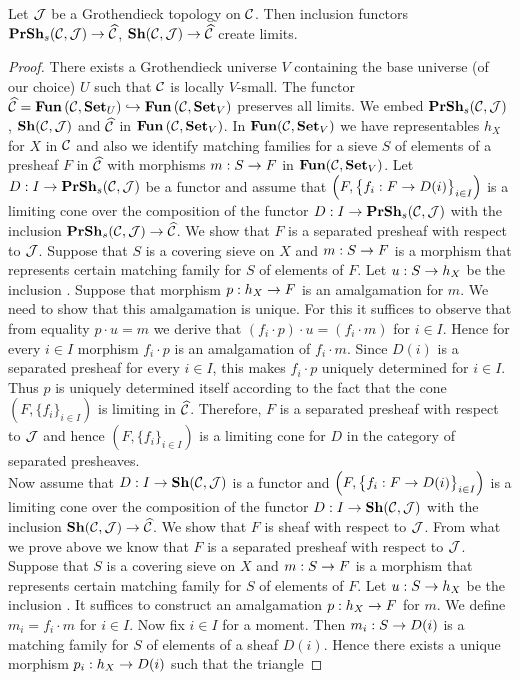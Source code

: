 \begin{theorem}\label{theorem:limitsinsheavesandseparatedpresheaves}
Let ${\mathcal J}$ be a Grothendieck topology on ${\mathcal C}$. Then inclusion functors $\mathbf{PrSh}_s({\mathcal C},{\mathcal J})\rightarrow \widehat{{\mathcal C}}$, $\mathbf{Sh}({\mathcal C},{\mathcal J})\rightarrow \widehat{{\mathcal C}}$ create limits.
\end{theorem}
\begin{proof}
There exists a Grothendieck universe $V$ containing the base universe (of our choice) $U$ such that ${\mathcal C}$ is locally $V$-small. The functor $\widehat{{\mathcal C}} = \mathbf{Fun}\left({\mathcal C},\mathbf{Set}_U\right) \hookrightarrow \mathbf{Fun}\left({\mathcal C},\mathbf{Set}_V\right)$ preserves all limits. We embed $\mathbf{PrSh}_s({\mathcal C},{\mathcal J})$, $\mathbf{Sh}({\mathcal C},{\mathcal J})$ and $\widehat{{\mathcal C}}$ in $\mathbf{Fun}\left({\mathcal C},\mathbf{Set}_V\right)$. In $\mathbf{Fun}({\mathcal C},\mathbf{Set}_V)$ we have representables $h_X$ for $X$ in ${\mathcal C}$ and also we identify matching families for a sieve $S$ of elements of a presheaf $F$ in $\widehat{{\mathcal C}}$ with morphisms $m:S\rightarrow F$ in $\mathbf{Fun}({\mathcal C},\mathbf{Set}_V)$. Let $D:I\rightarrow \mathbf{PrSh}_s({\mathcal C},{\mathcal J})$ be a functor and assume that $\left(F,\big\{f_i:F\rightarrow D(i)\big\}_{i\in I}\right)$ is a limiting cone over the composition of the functor $D:I\rightarrow \mathbf{PrSh}_s({\mathcal C},{\mathcal J})$ with the inclusion $\mathbf{PrSh}_s({\mathcal C},{\mathcal J})\rightarrow \widehat{{\mathcal C}}$. We show that $F$ is a separated presheaf with respect to ${\mathcal J}$. Suppose that $S$ is a covering sieve on $X$ and $m:S\rightarrow F$ is a morphism  that represents certain matching family for $S$ of elements of $F$. Let $u:S\rightarrow h_X$ be the inclusion . Suppose that morphism $p:h_X\rightarrow F$  is an amalgamation for $m$. We need to show that this amalgamation is unique. For this it suffices to observe that from equality $p\cdot u = m$ we derive that $(f_i\cdot p)\cdot u = (f_i\cdot m)$ for $i\in I$. Hence for every $i\in I$ morphism $f_i\cdot p$ is an amalgamation of $f_i\cdot m$. Since $D(i)$ is a separated presheaf for every $i\in I$, this makes $f_i\cdot p$ uniquely determined for $i\in I$. Thus $p$ is uniquely determined itself according to the fact that the cone $\left(F,\big\{f_i\big\}_{i\in I}\right)$ is limiting in $\widehat{{\mathcal C}}$. Therefore, $F$ is a separated presheaf with respect to ${\mathcal J}$ and hence $\left(F,\big\{f_i\big\}_{i\in I}\right)$ is a limiting cone for $D$ in the category of separated presheaves.\\
Now assume that $D:I\rightarrow \mathbf{Sh}({\mathcal C},{\mathcal J})$ is a functor and $\left(F,\big\{f_i:F\rightarrow D(i)\big\}_{i\in I}\right)$ is a limiting cone over the composition of the functor $D:I\rightarrow \mathbf{Sh}({\mathcal C},{\mathcal J})$ with the inclusion $\mathbf{Sh}({\mathcal C},{\mathcal J})\rightarrow \widehat{{\mathcal C}}$. We show that $F$ is sheaf with respect to ${\mathcal J}$. From what we prove above we know that $F$ is a separated presheaf with respect to ${\mathcal J}$. Suppose that $S$ is a covering sieve on $X$ and $m:S\rightarrow F$ is a morphism  that represents certain matching family for $S$ of elements of $F$. Let $u:S\rightarrow h_X$ be the inclusion . It suffices to construct an amalgamation $p:h_X\rightarrow F$  for $m$. We define $m_i = f_i \cdot m$ for $i\in I$. Now fix $i\in I$ for a moment. Then $m_i:S\rightarrow D(i)$ is a matching family for $S$ of elements of a sheaf $D(i)$. Hence there exists a unique morphism $p_i:h_X\rightarrow D(i)$  such that the triangle

\end{proof}
